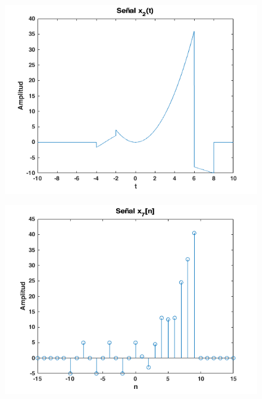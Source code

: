 \documentclass{article}
\begin{document}
\begin{figure} \caption[Figura 6]{}
	\centering
		\includegraphics[width=\linewidth]{./Figures/06.png}
\end{figure}

\begin{figure} \caption[Figura 7]{}
	\centering
		\includegraphics[width=\linewidth]{./Figures/07.png}
\end{figure}
\end{document}
